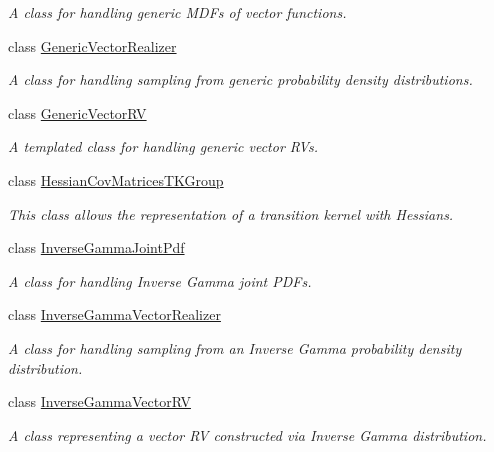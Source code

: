 \begin{DoxyCompactItemize}
\begin{DoxyCompactList}\small\item\em A class for handling generic M\-D\-Fs of vector functions. \end{DoxyCompactList}\item 
class \hyperlink{class_q_u_e_s_o_1_1_generic_vector_realizer}{Generic\-Vector\-Realizer}
\begin{DoxyCompactList}\small\item\em A class for handling sampling from generic probability density distributions. \end{DoxyCompactList}\item 
class \hyperlink{class_q_u_e_s_o_1_1_generic_vector_r_v}{Generic\-Vector\-R\-V}
\begin{DoxyCompactList}\small\item\em A templated class for handling generic vector R\-Vs. \end{DoxyCompactList}\item 
class \hyperlink{class_q_u_e_s_o_1_1_hessian_cov_matrices_t_k_group}{Hessian\-Cov\-Matrices\-T\-K\-Group}
\begin{DoxyCompactList}\small\item\em This class allows the representation of a transition kernel with Hessians. \end{DoxyCompactList}\item 
class \hyperlink{class_q_u_e_s_o_1_1_inverse_gamma_joint_pdf}{Inverse\-Gamma\-Joint\-Pdf}
\begin{DoxyCompactList}\small\item\em A class for handling Inverse Gamma joint P\-D\-Fs. \end{DoxyCompactList}\item 
class \hyperlink{class_q_u_e_s_o_1_1_inverse_gamma_vector_realizer}{Inverse\-Gamma\-Vector\-Realizer}
\begin{DoxyCompactList}\small\item\em A class for handling sampling from an Inverse Gamma probability density distribution. \end{DoxyCompactList}\item 
class \hyperlink{class_q_u_e_s_o_1_1_inverse_gamma_vector_r_v}{Inverse\-Gamma\-Vector\-R\-V}
\begin{DoxyCompactList}\small\item\em A class representing a vector R\-V constructed via Inverse Gamma distribution. \end{DoxyCompactList}\item 

\end{DoxyCompactItemize}
